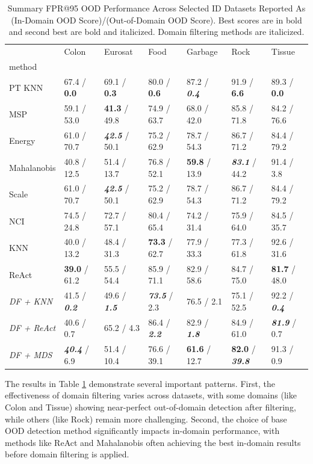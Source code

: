 \documentclass[11pt, oneside]{book}
\theoremstyle{plain}
\theoremstyle{definition}
\theoremstyle{remark}
\begin{document}
\begin{table}[h]
\centering
\caption{Summary FPR@95 OOD Performance Across Selected ID Datasets Reported As (In-Domain OOD Score)/(Out-of-Domain OOD Score). Best scores are in bold and second best are bold and italicized. Domain filtering methods are italicized.}
\label{tab:fpr95_selected}
\begin{tabular}{lllllll}
\toprule
& Colon & Eurosat & Food & Garbage & Rock & Tissue \\
method &  &  &  &  &  &  \\
\midrule
PT KNN & 67.4 / \textbf{0.0} & 69.1 / \textbf{0.3} & 80.0 / \textbf{0.6} & 87.2 / \textbf{\textit{0.4}} & 91.9 / \textbf{6.6} & 89.3 / \textbf{0.0} \\
MSP & 59.1 / 53.0 & \textbf{41.3} / 49.8 & 74.9 / 63.7 & 68.0 / 42.0 & 85.8 / 71.8 & 84.2 / 76.6 \\
Energy & 61.0 / 70.7 & \textbf{\textit{42.5}} / 50.1 & 75.2 / 62.9 & 78.7 / 54.3 & 86.7 / 71.2 & 84.4 / 79.2 \\
Mahalanobis & 40.8 / 12.5 & 51.4 / 13.7 & 76.8 / 52.1 & \textbf{59.8} / 13.9 & \textbf{\textit{83.1}} / 44.2 & 91.4 / 3.8 \\
Scale & 61.0 / 70.7 & \textbf{\textit{42.5}} / 50.1 & 75.2 / 62.9 & 78.7 / 54.3 & 86.7 / 71.2 & 84.4 / 79.2 \\
NCI & 74.5 / 24.8 & 72.7 / 57.1 & 80.4 / 65.4 & 74.2 / 31.4 & 75.9 / 64.0 & 84.5 / 35.7 \\
KNN & 40.0 / 13.2 & 48.4 / 31.3 & \textbf{73.3} / 62.7 & 77.9 / 33.3 & 77.3 / 61.8 & 92.6 / 31.6 \\
ReAct & \textbf{39.0} / 61.2 & 55.5 / 54.4 & 85.9 / 71.1 & 82.9 / 58.6 & 84.7 / 75.0 & \textbf{81.7} / 48.0 \\
\textit{DF + KNN} & 41.5 / \textbf{\textit{0.2}} & 49.6 / \textbf{\textit{1.5}} & \textbf{\textit{73.5}} / 2.3 & 76.5 / 2.1 & 75.1 / 52.5 & 92.2 / \textbf{\textit{0.4}} \\
\textit{DF + ReAct} & 40.6 / 0.7 & 65.2 / 4.3 & 86.4 / \textbf{\textit{2.2}} & 82.9 / \textbf{\textit{1.8}} & 84.9 / 61.0 & \textbf{\textit{81.9}} / 0.7 \\
\textit{DF + MDS} & \textbf{\textit{40.4}} / 6.9 & 51.4 / 10.4 & 76.6 / 39.1 & \textbf{61.6} / 12.7 & \textbf{82.0} / \textbf{\textit{39.8}} & 91.3 / 0.9 \\
\bottomrule
\end{tabular}
\end{table}

The results in Table \ref{tab:fpr95_selected} demonstrate several important patterns. First, the effectiveness of domain filtering varies across datasets, with some domains (like Colon and Tissue) showing near-perfect out-of-domain detection after filtering, while others (like Rock) remain more challenging. Second, the choice of base OOD detection method significantly impacts in-domain performance, with methods like ReAct and Mahalanobis often achieving the best in-domain results before domain filtering is applied.
\end{document}
